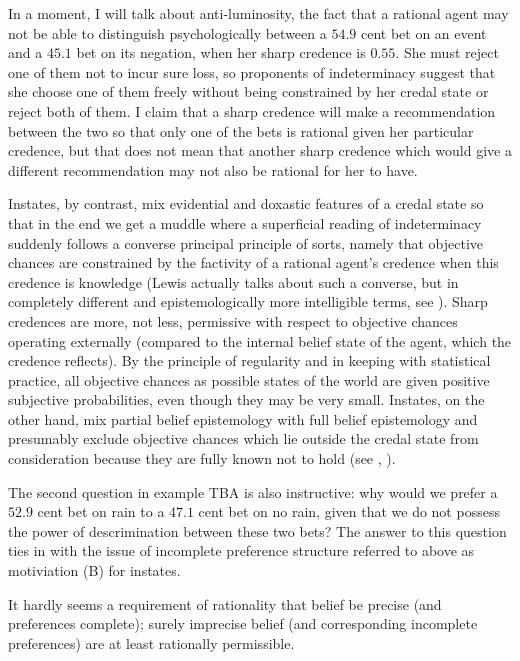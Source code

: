 \documentclass[11pt]{article}
\begin{document}
In a moment, I will talk about anti-luminosity, the fact that a
rational agent may not be able to distinguish psychologically between
a $54.9$ cent bet on an event and a $45.1$ bet on its negation, when
her sharp credence is $0.55$. She must reject one of them not to incur
sure loss, so proponents of indeterminacy suggest that she choose one
of them freely without being constrained by her credal state or reject
both of them. I claim that a sharp credence will make a recommendation
between the two so that only one of the bets is rational given her
particular credence, but that does not mean that another sharp
credence which would give a different recommendation may not also be
rational for her to have.

Instates, by contrast, mix evidential and doxastic features of a
credal state so that in the end we get a muddle where a superficial
reading of indeterminacy suddenly follows a converse principal
principle of sorts, namely that objective chances are constrained by
the factivity of a rational agent's credence when this credence is
knowledge (Lewis actually talks about such a converse, but in
completely different and epistemologically more intelligible terms,
see ). Sharp credences are more, not less,
permissive with respect to objective chances operating externally
(compared to the internal belief state of the agent, which the
credence reflects). By the principle of regularity and in keeping with
statistical practice, all objective chances as possible states of the
world are given positive subjective probabilities, even though they
may be very small. Instates, on the other hand, mix partial belief
epistemology with full belief epistemology and presumably exclude
objective chances which lie outside the credal state from
consideration because they are fully known not to hold (see
, ).

The second question in example TBA\tbd{} is also instructive: why
would we prefer a $52.9$ cent bet on rain to a $47.1$ cent bet on no
rain, given that we do not possess the power of descrimination between
these two bets? The answer to this question ties in with the issue of
incomplete preference structure referred to above as motiviation (B)
for instates.

\begin{quotex}
  It hardly seems a requirement of rationality that belief be precise
  (and preferences complete); surely imprecise belief (and
  corresponding incomplete preferences) are at least rationally
  permissible. 
\end{quotex}
\end{document}
